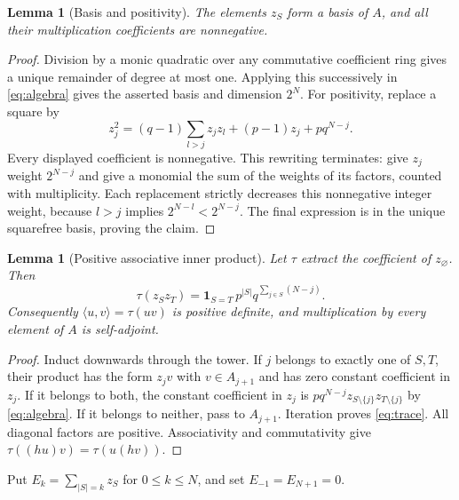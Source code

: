 \documentclass[11pt]{article}
\newtheorem{lemma}[theorem]{Lemma}
\begin{document}
\begin{lemma}[Basis and positivity]\label{lem:basis}
The elements $z_S$ form a basis of $A$, and all their multiplication coefficients are nonnegative.
\end{lemma}
\begin{proof}
Division by a monic quadratic over any commutative coefficient ring gives a unique remainder of degree at most one. Applying this successively in \eqref{eq:algebra} gives the asserted basis and dimension $2^N$.
For positivity, replace a square by
\[
z_j^2=(q-1)\sum_{l>j}z_jz_l+(p-1)z_j+pq^{N-j}.
\]
Every displayed coefficient is nonnegative. This rewriting terminates: give $z_j$ weight $2^{N-j}$ and give a monomial the sum of the weights of its factors, counted with multiplicity. Each replacement strictly decreases this nonnegative integer weight, because $l>j$ implies $2^{N-l}<2^{N-j}$. The final expression is in the unique squarefree basis, proving the claim.
\end{proof}

\begin{lemma}[Positive associative inner product]\label{lem:trace}
Let $\tau$ extract the coefficient of $z_\varnothing$. Then
\begin{equation}\label{eq:trace}
\tau(z_Sz_T)=\boldsymbol1_{S=T}\,p^{|S|}q^{\sum_{j\in S}(N-j)}.
\end{equation}
Consequently $\langle u,v\rangle=\tau(uv)$ is positive definite, and multiplication by every element of $A$ is self-adjoint.
\end{lemma}
\begin{proof}
Induct downwards through the tower. If $j$ belongs to exactly one of $S,T$, their product has the form $z_jv$ with $v\in A_{j+1}$ and has zero constant coefficient in $z_j$. If it belongs to both, the constant coefficient in $z_j$ is $pq^{N-j}z_{S\setminus\{j\}}z_{T\setminus\{j\}}$ by \eqref{eq:algebra}. If it belongs to neither, pass to $A_{j+1}$. Iteration proves \eqref{eq:trace}. All diagonal factors are positive. Associativity and commutativity give $\tau((hu)v)=\tau(u(hv))$.
\end{proof}

Put $E_k=\sum_{|S|=k}z_S$ for $0\leq k\leq N$, and set $E_{-1}=E_{N+1}=0$.
\end{document}
